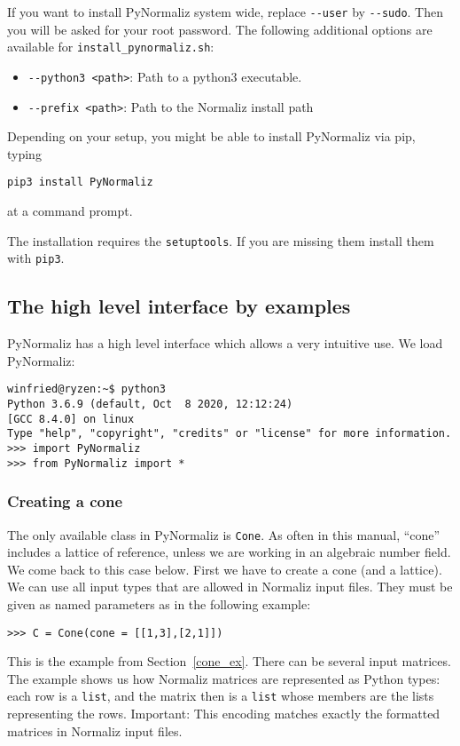 \begin{small}
If you want to install PyNormaliz system wide,
replace \verb|--user| by \verb|--sudo|. Then you will be asked for your root password.
The following additional options are available for \verb|install_pynormaliz.sh|:
\begin{itemize}
	\item \verb|--python3 <path>|: Path to a python3 executable.
	\item \verb|--prefix <path>|: Path to the Normaliz install path
\end{itemize}

Depending on your setup, you might be able to install PyNormaliz via pip, typing
\begin{Verbatim}
pip3 install PyNormaliz
\end{Verbatim}
at a command prompt.

The installation requires the \verb|setuptools|. If you are missing them install them with  \verb|pip3|.


\subsection{The high level interface by examples}

PyNormaliz has a high level interface which allows a very intuitive use. We load PyNormaliz:
\begin{Verbatim}
winfried@ryzen:~$ python3
Python 3.6.9 (default, Oct  8 2020, 12:12:24) 
[GCC 8.4.0] on linux
Type "help", "copyright", "credits" or "license" for more information.
>>> import PyNormaliz
>>> from PyNormaliz import *
\end{Verbatim}

\subsubsection{Creating a cone}

The only available class in PyNormaliz is \verb|Cone|. As often in this manual, ``cone'' includes a lattice of reference, unless we are working in an algebraic number field. We come back to this case below. First we have to create a cone (and a lattice). We can use all input types that are allowed in Normaliz input files. They must be given as named parameters as in the following example:
\begin{Verbatim}
>>> C = Cone(cone = [[1,3],[2,1]])
\end{Verbatim}
This is the example from Section~\ref{cone_ex}. There can be several input matrices. The example shows us how Normaliz matrices are represented as Python types: each row is a \verb|list|, and the matrix then is a \verb|list| whose members are the lists representing the rows. Important: This encoding matches exactly the formatted matrices in Normaliz input files.


\end{small}
